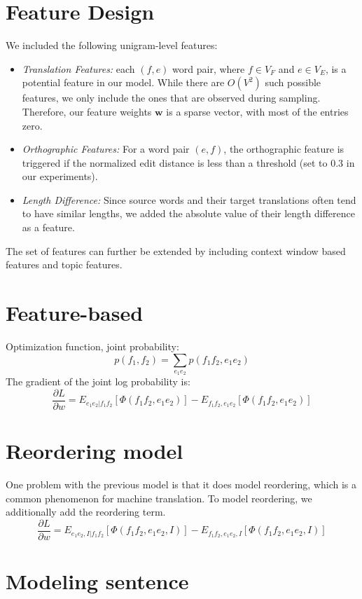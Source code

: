 \section{Feature Design}
\label{sec:feature}
We included the following unigram-level features:
\begin{itemize}
\item \emph{Translation Features:} each $(f, e)$ word pair, where $f  \in V_F $ and $e \in V_E$, is a potential feature in our model. While there are $O(V^2)$ such possible features, we only include the ones that are observed during sampling. 
Therefore, our feature weights $\mathbf{w}$ is a sparse vector, with most of the entries zero.
\item \emph{Orthographic Features:} 
For a word pair $(e, f)$, the orthographic feature is triggered if the normalized edit distance is less than a threshold (set to 0.3 in our experiments).
\item \emph{Length Difference:} Since source words and their target translations often tend to have similar lengths, we added the absolute value of their length difference as a feature. 
\end{itemize}
The set of features can further be extended by including context window based features and topic features.
\section{Feature-based}
Optimization function, joint probability:
$$p(f_1,f_2) = \sum_{e_1e_2}p(f_1f_2,e_1e_2)$$
The gradient of the joint log probability is:
$$\frac{\partial L}{\partial w} = E_{e_1e_2|f_1f_2}[\Phi(f_1f_2,e_1e_2)] - E_{f_1f_2,e_1e_2}[\Phi(f_1f_2,e_1e_2)]$$
\section{Reordering model}
One problem with the previous model is that it does model reordering, which is a common phenomenon for machine translation. To model reordering, we additionally add the reordering term.
$$\frac{\partial L}{\partial w} = E_{e_1e_2, I|f_1f_2}[\Phi(f_1f_2,e_1e_2, I)] - E_{f_1f_2,e_1e_2, I}[\Phi(f_1f_2,e_1e_2,I)]$$
\section{Modeling sentence}
